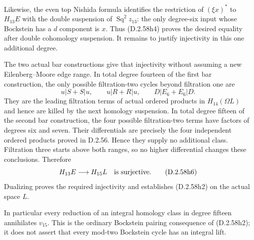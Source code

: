 Likewise, the even top Nishida formula identifies the restriction
of $(\xi x)^*$ to $H_{13}E$ with the double suspension of
$\operatorname{Sq}^2z_{13}$: the only degree-six input whose
Bockstein has a $d$ component is $x$.
Thus \textup{(D.2.58h4)} proves the desired equality after double
cohomology suspension. It remains to justify injectivity in this
one additional degree.

The two actual bar constructions give that injectivity without
assuming a new Eilenberg--Moore edge range. In total degree fourteen
of the first bar construction, the only possible filtration-two
cycles beyond filtration one are
\[
 u|S+S|u,\qquad u|R+R|u,\qquad D|E_6+E_6|D.
 \tag{D.2.58h5}
\]
They are the leading filtration terms of actual ordered products
in $H_{14}(\Omega L)$ and hence are killed by the next homology
suspension. In total degree fifteen of the second bar construction,
the four possible filtration-two terms have factors of degrees
six and seven. Their differentials are precisely the four
independent ordered products proved in D.2.56. Hence they supply
no additional class. Filtration three starts above both ranges,
so no higher differential changes these conclusions. Therefore
\[
       H_{13}E\longrightarrow H_{15}L
       \quad\hbox{is surjective}.
       \tag{D.2.58h6}
\]
Dualizing proves the required injectivity and establishes
\textup{(D.2.58h2)} on the actual space $L$.

In particular every reduction of an integral homology class in
degree fifteen annihilates $v_{15}$. This is the ordinary
Bockstein pairing consequence of \textup{(D.2.58h2)}; it does not
assert that every mod-two Bockstein cycle has an integral lift.

